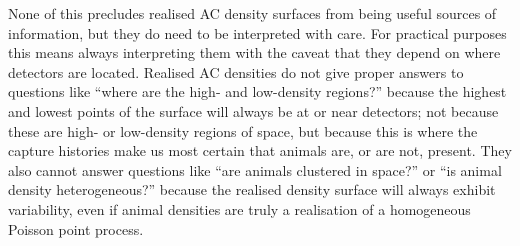 \documentclass[10pt,a4paper]{article}
\begin{document}
None of this precludes realised AC density surfaces from being useful sources of information, but they do need to be interpreted with care. For practical purposes this means always interpreting them with the caveat that they depend on where detectors are located. Realised AC densities do not give proper answers to questions like ``where are the high- and low-density regions?'' because the highest and lowest points of the surface will always be at or near detectors; not because these are high- or low-density regions of space, but because this is where the capture histories make us most certain that animals are, or are not, present. They also cannot answer questions like ``are animals clustered in space?'' or ``is animal density heterogeneous?'' because the realised density surface will always exhibit variability, even if animal densities are truly a realisation of a homogeneous Poisson point process.

\end{document}
